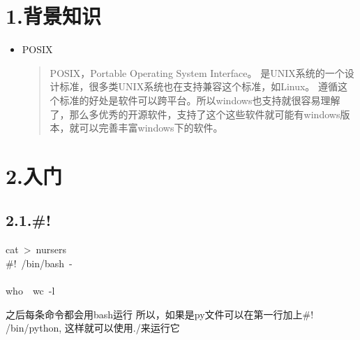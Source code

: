 \documentclass{article}
\begin{document}
\mdxtitleblockstart{}
\mdxauthorstart{}
\mdxauthorend\mdtitleauthorrunning{}{}\mdxtitleblockend%

\section{1.\hspace*{0.5em}背景知识}\label{section}%

\begin{itemize}[noitemsep,topsep=\mdcompacttopsep]%

\item{}POSIX

\begin{quote}%
POSIX，Portable Operating System Interface。\mdbr
{}是UNIX系统的一个设计标准，很多类UNIX系统也在支持兼容这个标准，如Linux。\mdbr
{}遵循这个标准的好处是软件可以跨平台。所以windows也支持就很容易理解了，那么多优秀的开源软件，支持了这个这些软件就可能有windows版本，就可以完善丰富windows下的软件。
\end{quote}%
\end{itemize}%

\section{2.\hspace*{0.5em}入门}\label{section}%

\subsection{2.1.\hspace*{0.5em}\#!}\label{section}%
\begin{mdpre}%
\noindent{}cat~\textgreater{}~nursers\\
\#!~/bin/bash~-\\
\\
who~\textbar{}~wc~-l%
\end{mdpre}\noindent{}\mdbr
{}之后每条命令都会用bash运行
所以，如果是py文件可以在第一行加上\#! /bin/python, 这样就可以使用./来运行它
\end{document}
